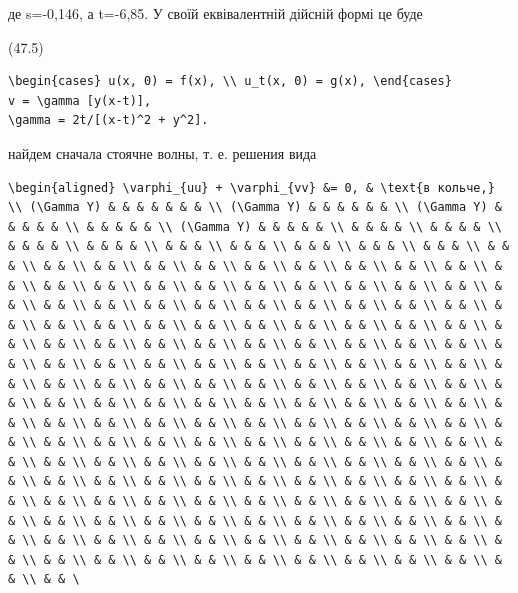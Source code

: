 \documentclass[
  ukrainian,
]{article}
\begin{document}
де s=-0,146, а t=-6,85. У своїй еквівалентній дійсній формі це буде

(47.5)

\begin{verbatim}
\begin{cases} u(x, 0) = f(x), \\ u_t(x, 0) = g(x), \end{cases}
v = \gamma [y(x-t)],
\gamma = 2t/[(x-t)^2 + y^2].
\end{verbatim}

найдем сначала стоячне волны, т. е. решения вида

\begin{verbatim}
\begin{aligned} \varphi_{uu} + \varphi_{vv} &= 0, & \text{в кольче,} \\ (\Gamma Y) & & & & & & & \\ (\Gamma Y) & & & & & & \\ (\Gamma Y) & & & & & \\ & & & & & \\ (\Gamma Y) & & & & & \\ & & & & \\ & & & & \\ & & & & \\ & & & & \\ & & & \\ & & & \\ & & & \\ & & & \\ & & & \\ & & & \\ & & \\ & & \\ & & \\ & & \\ & & \\ & & \\ & & \\ & & \\ & & \\ & & \\ & & \\ & & \\ & & \\ & & \\ & & \\ & & \\ & & \\ & & \\ & & \\ & & \\ & & \\ & & \\ & & \\ & & \\ & & \\ & & \\ & & \\ & & \\ & & \\ & & \\ & & \\ & & \\ & & \\ & & \\ & & \\ & & \\ & & \\ & & \\ & & \\ & & \\ & & \\ & & \\ & & \\ & & \\ & & \\ & & \\ & & \\ & & \\ & & \\ & & \\ & & \\ & & \\ & & \\ & & \\ & & \\ & & \\ & & \\ & & \\ & & \\ & & \\ & & \\ & & \\ & & \\ & & \\ & & \\ & & \\ & & \\ & & \\ & & \\ & & \\ & & \\ & & \\ & & \\ & & \\ & & \\ & & \\ & & \\ & & \\ & & \\ & & \\ & & \\ & & \\ & & \\ & & \\ & & \\ & & \\ & & \\ & & \\ & & \\ & & \\ & & \\ & & \\ & & \\ & & \\ & & \\ & & \\ & & \\ & & \\ & & \\ & & \\ & & \\ & & \\ & & \\ & & \\ & & \\ & & \\ & & \\ & & \\ & & \\ & & \\ & & \\ & & \\ & & \\ & & \\ & & \\ & & \\ & & \\ & & \\ & & \\ & & \\ & & \\ & & \\ & & \\ & & \\ & & \\ & & \\ & & \\ & & \\ & & \\ & & \\ & & \\ & & \\ & & \\ & & \\ & & \\ & & \\ & & \\ & & \\ & & \\ & & \\ & & \\ & & \\ & & \\ & & \\ & & \\ & & \\ & & \\ & & \\ & & \\ & & \\ & & \\ & & \\ & & \\ & & \\ & & \\ & & \\ & & \\ & & \\ & & \\ & & \\ & & \
\end{verbatim}
\end{document}
